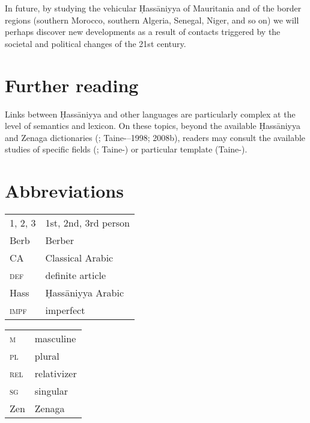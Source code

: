 \documentclass[output=paper]{langsci/langscibook}
\begin{document}
In future, by studying the vehicular Ḥassāniyya of Mauritania and of the border regions (southern Morocco, southern Algeria, Senegal, Niger, and so on) we will perhaps discover new developments as a result of contacts triggered by the societal and political changes of the 21st century. 

\section*{Further reading}

Links between Ḥassāniyya and other languages are particularly complex at the level of semantics and lexicon. On these topics, beyond the available Ḥassāniyya and Zenaga dictionaries (\citealt{Heath2004}; Taine-\citealt{Cheikh1988}–1998; 2008b), readers may consult the available studies of specific fields (\citealt{Monteil1952}; Taine-\citealt{Cheikh2013}) or particular template (Taine-\citealt{Cheikh2018b}).

\section*{Abbreviations}
\begin{tabularx}{.5\textwidth}{@{}lQ@{}}
\textsc{1, 2, 3} & 1st, 2nd, 3rd person \\
Berb            & Berber \\
CA           & Classical Arabic \\
\textsc{def}     & definite article \\
Hass           & Ḥassāniyya Arabic \\
\textsc{impf}   & imperfect \\
\end{tabularx}%
\begin{tabularx}{.5\textwidth}{@{}lQ@{}}
\textsc{m}   & masculine\\
\textsc{pl}  & plural\\
\textsc{rel}     & relativizer\\
\textsc{sg}  & singular \\
Zen           & Zenaga \\
\end{tabularx}%
 
\end{document}
